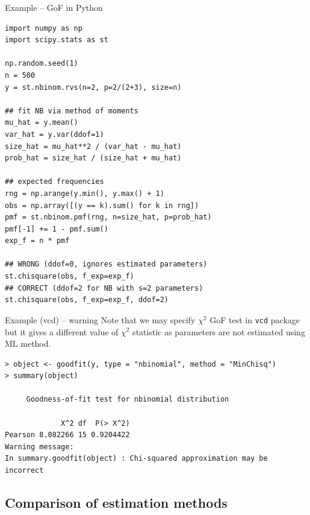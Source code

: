 \documentclass[10pt,ignorenonframetext,aspectratio=169]{beamer}
\begin{document}
\begin{frame}[fragile]{Example -- GoF in Python}
\small
\begin{verbatim}
import numpy as np
import scipy.stats as st

np.random.seed(1)
n = 500
y = st.nbinom.rvs(n=2, p=2/(2+3), size=n)

## fit NB via method of moments
mu_hat = y.mean()
var_hat = y.var(ddof=1)
size_hat = mu_hat**2 / (var_hat - mu_hat)
prob_hat = size_hat / (size_hat + mu_hat)

## expected frequencies
rng = np.arange(y.min(), y.max() + 1)
obs = np.array([(y == k).sum() for k in rng])
pmf = st.nbinom.pmf(rng, n=size_hat, p=prob_hat)
pmf[-1] += 1 - pmf.sum()
exp_f = n * pmf

## WRONG (ddof=0, ignores estimated parameters)
st.chisquare(obs, f_exp=exp_f)
## CORRECT (ddof=2 for NB with s=2 parameters)
st.chisquare(obs, f_exp=exp_f, ddof=2)
\end{verbatim}
\end{frame}

\begin{frame}[fragile]{Example (vcd) -- warning}
    Note that we may specify $\chi^2$ GoF test in \texttt{vcd} package but it gives a different value of $\chi^2$ statistic as parameters are not estimated using ML method.

\begin{verbatim}
> object <- goodfit(y, type = "nbinomial", method = "MinChisq")
> summary(object)

	 Goodness-of-fit test for nbinomial distribution

             X^2 df  P(> X^2)
Pearson 8.082266 15 0.9204422
Warning message:
In summary.goodfit(object) : Chi-squared approximation may be incorrect
\end{verbatim}
\end{frame}

\subsection{Comparison of estimation methods}
\end{document}
